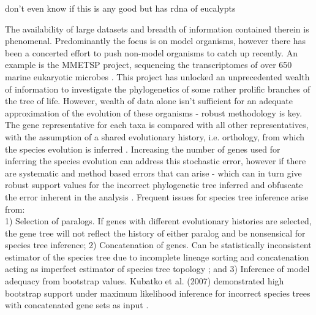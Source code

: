 \documentclass[12pt]{article}
\begin{document}
\cite{ochieng2007nuclear}  don't even know if this is any good but has rdna of eucalypts


The availability of large datasets and breadth of information contained therein is phenomenal. 
Predominantly the focus is on model organisms, however there has been a concerted effort to push non-model organisms to catch up recently. 
An example is the MMETSP project, sequencing the transcriptomes of over 650 marine eukaryotic microbes \cite{keeling2014marine}. 
This project has unlocked an unprecedented wealth of information to investigate the phylogenetics of some rather prolific branches of the tree of life. 
However, wealth of data alone isn't sufficient for an adequate approximation of the evolution of these organisms - robust methodology is key. 
The gene representative for each taxa is compared with all other representatives, with the assumption of a shared evolutionary history, i.e. orthology, from which the species evolution is inferred \cite{maddison1997gene}. 
Increasing the number of genes used for inferring the species evolution can address this stochastic error, however if there are systematic and method based errors that can arise - which can in turn give robust support values for the incorrect phylogenetic tree inferred and obfuscate the error inherent in the analysis \cite{jeffroy2006phylogenomics,roch2015likelihood,kubatko2007inconsistency}. 
Frequent issues for species tree inference arise from:\\
1) Selection of paralogs. If genes with different evolutionary histories are selected, the gene tree will not reflect the history of either paralog and be nonsensical for species tree inference; 
2) Concatenation of genes. Can be statistically inconsistent estimator of the species tree due to incomplete lineage sorting and concatenation acting as imperfect estimator of species tree topology \cite{roch2015likelihood}; and 
3) Inference of model adequacy from bootstrap values. Kubatko et al. (2007) demonstrated high bootstrap support under maximum likelihood inference for incorrect species trees with concatenated gene sets as input \cite{kubatko2007inconsistency}. 
\end{document}
